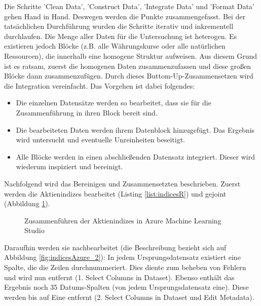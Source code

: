 Die Schritte 'Clean Data', 'Construct Data', 'Integrate Data' und 'Format Data' gehen Hand in Hand. Deswegen werden die Punkte zusammengefasst. Bei der tatsächlichen Durchführung wurden die Schritte iterativ und inkrementell durchlaufen. \newline
Die Menge aller Daten für die Untersuchung ist heterogen. Es existieren jedoch Blöcke (z.B. alle Währungskurse oder alle natürlichen Ressourcen), die innerhalb eine homogene Struktur aufweisen. Aus diesem Grund ist es ratsam, zuerst die homogenen Daten zusammenzufassen und diese großen Blöcke dann zusammenzufügen. Durch dieses Buttom-Up-Zusammensetzen wird die Integration vereinfacht.
Das Vorgehen ist dabei folgendes:
\begin{itemize}
\item Die einzelnen Datensätze werden so bearbeitet, dass sie für die Zusammenführung in ihren Block bereit sind.
\item Die bearbeiteten Daten werden ihrem Datenblock hinzugefügt. Das Ergebnis wird untersucht und eventuelle Unreinheiten beseitigt.
\item Alle Blöcke werden in einen abschließenden Datensatz integriert. Dieser wird wiederum inspiziert und bereinigt.
\end{itemize}
Nachfolgend wird das Bereinigen und Zusammensetzten beschrieben. Zuerst werden die Aktienindizes bearbeitet (Listing \ref{list:indicesR}) und gejoint (Abbildung \ref{fig:indicesAzure_1}). 

\begin{figure}[H]
\centering
{}
\caption{Zusammenführen der Aktienindizes in Azure Machine Learning Studio}
\label{fig:indicesAzure_1}
\end{figure}
Daraufhin werden sie nachbearbeitet (die Beschreibung bezieht sich auf Abbildung \ref{fig:indicesAzure_2}): In jedem Ursprungsdatensatz existiert eine Spalte, die die Zeilen durchnummeriert. Dies diente zum beheben von Fehlern und wird nun entfernt (1. Select Columns in Dataset). Ebenso enthält das Ergebnis noch 35 Datums-Spalten (von jedem Ursprungsdatensatz eine). Diese werden bis auf Eine entfernt (2. Select Columns in Dataset und Edit Metadata).
